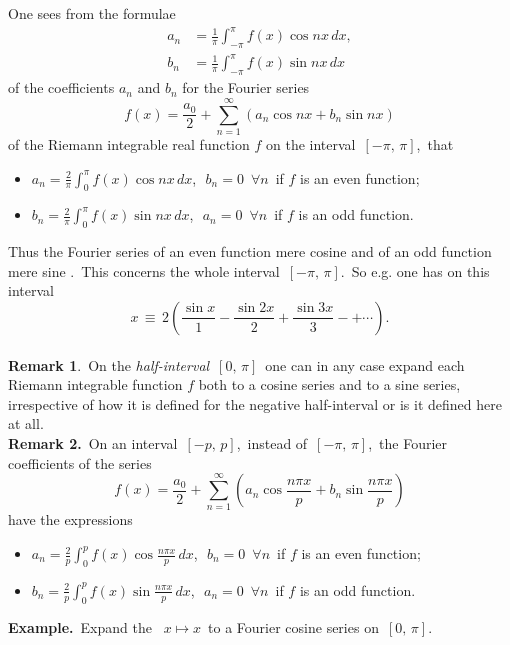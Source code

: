 \documentclass[12pt]{article}
\theoremstyle{definition}
\begin{document}
One sees from the formulae 
\begin{align*}
a_n &= \frac{1}{\pi}\int_{-\pi}^{\pi} f(x)\cos{nx}\,dx,\\
b_n &= \frac{1}{\pi}\int_{-\pi}^{\pi} f(x)\sin{nx}\,dx
\end{align*}
of the coefficients $a_n$ and $b_n$ for the Fourier series 
$$f(x) = \frac{a_0}{2}+\sum_{n=1}^\infty(a_n\cos{nx}+b_n\sin{nx})$$
of the Riemann integrable real function $f$ on the interval\, $[-\pi,\,\pi]$,\, that 
\begin{itemize}
\item $\displaystyle a_n = \frac{2}{\pi}\int_0^\pi\!f(x)\cos{nx}\,dx$,\,\, 
$b_n = 0$\, $\forall n$\, if $f$ is an even function;
\item $\displaystyle b_n = \frac{2}{\pi}\int_0^\pi\!f(x)\sin{nx}\,dx$,\,\, 
$a_n = 0$\, $\forall n$\, if $f$ is an odd function.
\end{itemize}
Thus the Fourier series of an even function  mere cosine  and of an odd function mere sine .\, This concerns the whole interval\, 
$[-\pi,\,\pi]$.\, So e.g. one has on this interval
$$x \,\equiv\, 
 2\!\left(\frac{\sin{x}}{1}\!-\!\frac{\sin{2x}}{2}\!+\!\frac{\sin{3x}}{3}\!
-+\cdots\right).$$\\

\textbf{Remark 1}.\, On the {\em half-interval}\, $[0,\,\pi]$\, one can in any case expand each Riemann integrable function $f$ both to a cosine series and to a sine series, irrespective of how it is defined for the negative half-interval or is it defined here at all.\\

\textbf{Remark 2.}\, On an interval\, $[-p,\,p]$,\, instead of\, 
$[-\pi,\,\pi]$,\, the Fourier coefficients of the series
$$f(x) = 
\frac{a_0}{2}+\sum_{n=1}^\infty\left(a_n\cos\frac{n\pi x}{p}
+b_n\sin\frac{n\pi x}{p}\right)$$
have the expressions
\begin{itemize}
\item $\displaystyle a_n = 
 \frac{2}{p}\int_0^p\!f(x)\cos\frac{n\pi x}{p}\,dx$,\,\, 
$b_n = 0$\, $\forall n$\, if $f$ is an even function;
\item $\displaystyle b_n =
 \frac{2}{p}\int_0^p\!f(x)\sin\frac{n\pi x}{p}\,dx$,\,\,
$a_n = 0$\, $\forall n$\, if $f$ is an odd function.
\end{itemize}


\textbf{Example.}\, Expand the \, $x\mapsto x$\, to a Fourier cosine series on\, $[0,\,\pi]$.
\end{document}
